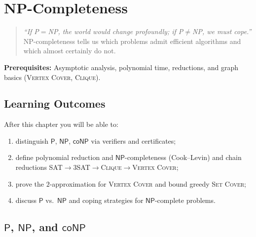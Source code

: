 \chapter{NP-Completeness}
\label{ch:np}

\begin{quote}
\emph{``If P${}=$NP, the world would change profoundly; if P${}\neq$NP, we must cope.''}
NP-completeness tells us which problems admit efficient algorithms and which almost certainly do not.
\end{quote}

\noindent\textbf{Prerequisites:} Asymptotic analysis, polynomial time, reductions, and graph basics (\textsc{Vertex Cover}, \textsc{Clique}).
\section*{Learning Outcomes}
After this chapter you will be able to:
\begin{enumerate}[label=(L\arabic*)]
    \item distinguish $\mathsf{P}$, $\mathsf{NP}$, $\mathsf{coNP}$ via verifiers and certificates;
    \item define polynomial reduction and $\mathsf{NP}$-completeness (Cook--Levin) and chain reductions SAT${}\to{}$3SAT${}\to{}$\textsc{Clique}${}\to{}$\textsc{Vertex Cover};
    \item prove the $2$-approximation for \textsc{Vertex Cover} and bound greedy \textsc{Set Cover};
    \item discuss $\mathsf{P}$ vs.\ $\mathsf{NP}$ and coping strategies for $\mathsf{NP}$-complete problems.
\end{enumerate}

\section{\texorpdfstring{$\mathsf{P}$, $\mathsf{NP}$, and $\mathsf{coNP}$}{P, NP, and coNP}}
\label{sec:p-np}

